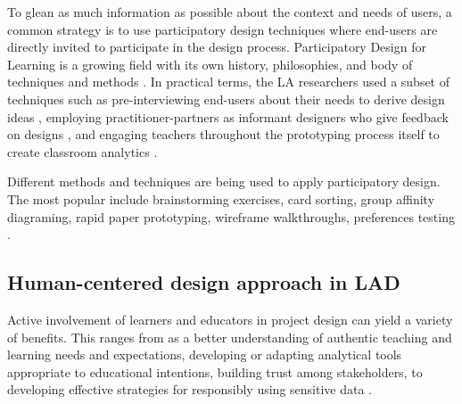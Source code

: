 \documentclass[preprint,12pt]{elsarticle}
\begin{document}
To glean as much information as possible about the context and needs of users, 
a common strategy is to use participatory design techniques where end-users are directly invited to participate in the design process. 
Participatory Design for Learning is a growing field with its own history, philosophies, and body of techniques and methods \cite{disalvo2017participatory}. In practical terms, the LA researchers used a subset of techniques such as pre-interviewing end-users about 
their needs to derive design ideas \cite{xhakaj2016teachers}, employing practitioner-partners as informant designers who give feedback on 
designs \cite{fiorini2018application}, and engaging teachers throughout the prototyping process itself to create classroom analytics \cite{holstein2018classroom}.

Different methods and techniques are being used to apply participatory design. The most popular include brainstorming exercises, card sorting, group affinity diagraming, rapid paper prototyping, wireframe walkthroughs, preferences testing \cite{abel2013cross}. 

\subsection{Human-centered design approach in LAD}

Active involvement of learners and educators in project design can yield a variety of benefits. This ranges from as a better understanding of authentic teaching and learning needs and expectations, developing or adapting analytical tools appropriate to educational intentions, building trust among stakeholders, to developing effective strategies for responsibly using sensitive data \cite{beattie2014creepy}.
\end{document}
